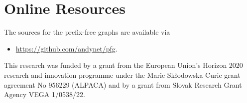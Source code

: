 \documentclass[twocolumn]{ceurart}
\begin{document}






\section{Online Resources}
The sources for the prefix-free graphs are available via
\begin{itemize}
\item \href{https://github.com/andynet/pfg}{https://github.com/andynet/pfg}.
\end{itemize}

\begin{acknowledgments}
This research was funded by a grant from the European Union’s Horizon 2020 research and innovation programme under the Marie Skłodowska-Curie grant agreement No 956229 (ALPACA) and by a grant from Slovak Research Grant Agency VEGA 1/0538/22.
\end{acknowledgments}


\end{document}
